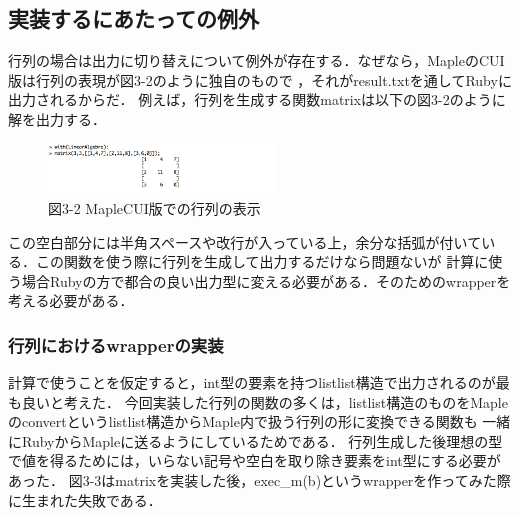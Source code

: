 \subsection{実装するにあたっての例外}
行列の場合は出力に切り替えについて例外が存在する．なぜなら，MapleのCUI版は行列の表現が図3-2のように独自のもので
，それがresult.txtを通してRubyに出力されるからだ．
例えば，行列を生成する関数matrixは以下の図3-2のように解を出力する．

\begin{figure}[htbp]\begin{center}
\includegraphics[width=6cm,bb=0 0 442 500]{../figs/./mapleruby_eringi.004.png}
\caption{図3-2 MapleCUI版での行列の表示}
\label{default}\end{center}\end{figure}
この空白部分には半角スペースや改行が入っている上，余分な括弧が付いている．この関数を使う際に行列を生成して出力するだけなら問題ないが
計算に使う場合Rubyの方で都合の良い出力型に変える必要がある．そのためのwrapperを考える必要がある．

\subsubsection{行列におけるwrapperの実装}
計算で使うことを仮定すると，int型の要素を持つlistlist構造で出力されるのが最も良いと考えた．
今回実装した行列の関数の多くは，listlist構造のものをMapleのconvertというlistlist構造からMaple内で扱う行列の形に変換できる関数も
一緒にRubyからMapleに送るようにしているためである．
行列生成した後理想の型で値を得るためには，いらない記号や空白を取り除き要素をint型にする必要があった．
図3-3はmatrixを実装した後，exec\_m(b)というwrapperを作ってみた際に生まれた失敗である．


